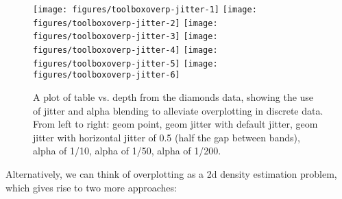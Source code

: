 \begin{Shaded}
\begin{Highlighting}[]
\StringTok{ }\StringTok{ }
\StringTok{  }\NormalTok{(}\NormalTok{, }\NormalTok{) +}\StringTok{ }\NormalTok{(}\NormalTok{, }\NormalTok{)}
\StringTok{ }\NormalTok{()}
\StringTok{ }\NormalTok{()}
\StringTok{ }\NormalTok{(} \NormalTok{)}
\StringTok{ }\NormalTok{(} 
\StringTok{ }\NormalTok{(}  \NormalTok{/}\NormalTok{)}
\StringTok{ }\NormalTok{(}  \NormalTok{/}\NormalTok{)}
\StringTok{ }\NormalTok{(}  \NormalTok{/}\NormalTok{)}
\end{Highlighting}
\end{Shaded}

\begin{figure}

{\centering \texttt{[image: figures/toolboxoverp-jitter-1]} \texttt{[image: figures/toolboxoverp-jitter-2]} \texttt{[image: figures/toolboxoverp-jitter-3]} \texttt{[image: figures/toolboxoverp-jitter-4]} \texttt{[image: figures/toolboxoverp-jitter-5]} \texttt{[image: figures/toolboxoverp-jitter-6]} 

}

\caption{A plot of table vs. depth from the diamonds data, showing the use of jitter and alpha blending to alleviate overplotting in discrete data. From left to right: geom point, geom jitter with default jitter, geom jitter with horizontal jitter of 0.5 (half the gap between bands), alpha of 1/10, alpha of 1/50, alpha of 1/200.\label{fig:overp-jitter}}
\end{figure}

Alternatively, we can think of overplotting as a 2d density estimation
problem, which gives rise to two more approaches:

